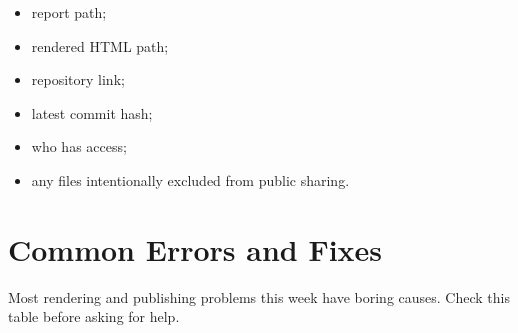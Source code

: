 \documentclass[
  letterpaper,
  DIV=11,
  numbers=noendperiod,
  oneside]{scrreprt}
\providecommand{\tightlist}{%
  \setlength{\itemsep}{0pt}\setlength{\parskip}{0pt}}
\begin{document}
\begin{itemize}
\tightlist
\item
  report path;
\item
  rendered HTML path;
\item
  repository link;
\item
  latest commit hash;
\item
  who has access;
\item
  any files intentionally excluded from public sharing.
\end{itemize}

\section*{Common Errors and Fixes}\label{common-errors-and-fixes}


Most rendering and publishing problems this week have boring causes.
Check this table before asking for help.
\end{document}
